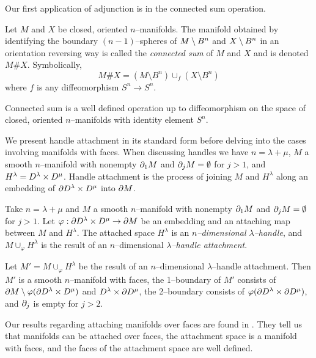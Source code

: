 Our first application of adjunction is in the connected sum operation.

\begin{defn}
	Let $M$ and $X$ be closed, oriented $n$--manifolds.
	The manifold obtained by identifying the boundary $(n-1)$--spheres of $M\setminus B^n$ and $X\setminus B^n$ in an orientation reversing way is called the \emph{connected sum} of $M$ and $X$ and is denoted $M\# X$.
	Symbolically,
	\[
		M\# X = (M\setminus B^n)\cup_f (X\setminus B^n)
	\]
	where $f$ is any diffeomorphism $S^n\to S^n$.
\end{defn}

\begin{prop}
	Connected sum is a well defined operation up to diffeomorphism on the space of closed, oriented $n$--manifolds with identity element $S^n$.
\end{prop}

We present handle attachment in its standard form before delving into the cases involving manifolds with faces.
When discussing handles we have $n=\lambda+\mu$, $M$ a smooth $n$--manifold with nonempty $\partial_1 M$ and $\partial_j M=\emptyset$ for $j>1$, and $H^\lambda = D^\lambda\times D^\mu$.
Handle attachment is the process of joining $M$ and $H^\lambda$ along an embedding of $\partial D^\lambda\times D^\mu$ into $\partial M$.

\begin{defn}[Handle]
	\label{def:handle}
	Take $n=\lambda+\mu$ and $M$ a smooth $n$--manifold with nonempty $\partial_1 M$ and $\partial_j M=\emptyset$ for $j>1$.
	Let $\varphi:\partial D^\lambda\times D^\mu\to\partial M$ be an embedding and an attaching map between $M$ and $H^\lambda$.
	The attached space $H^\lambda$ is an \emph{$n$--dimensional $\lambda$--handle}, and $M\cup_\varphi H^\lambda$ is the result of an $n$--dimensional \emph{$\lambda$--handle attachment}.
\end{defn}

\begin{prop}
	Let $M'=M\cup_\varphi H^\lambda$ be the result of an $n$--dimensional $\lambda$--handle attachment.
	Then $M'$ is a smooth $n$--manifold with faces, the 1--boundary of $M'$ consists of $\partial M\setminus\varphi(\partial D^\lambda\times D^\mu)$ and $D^\lambda\times\partial D^\mu$, the 2--boundary consists of $\varphi(\partial D^\lambda\times\partial D^\mu)$, and $\partial_j$ is empty for $j>2$.
\end{prop}

Our results regarding attaching manifolds over faces are found in \cite{JSP}.
They tell us that manifolds can be attached over faces, the attachment space is a manifold with faces, and the faces of the attachment space are well defined.

